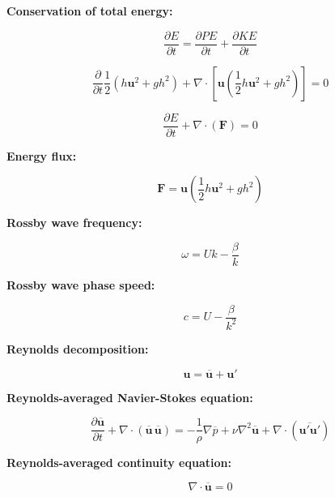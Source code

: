 \documentclass[12pt]{article}
\numberwithin{equation}{section}
\numberwithin{figure}{section}
\numberwithin{table}{section}
\begin{document}
\textbf{Conservation of total energy:}

\begin{equation}
  \frac{\partial E}{\partial t} = \frac{\partial PE}{\partial t} + \frac{\partial KE}{\partial t}
\end{equation}

\begin{equation}
  \frac{\partial}{\partial t} \frac{1}{2} \left(h\mathbf{u}^2 + gh^2\right)
  + \nabla \cdot \left[ \mathbf{u} \left( \frac{1}{2} h\mathbf{u}^2 + gh^2\right) \right] = 0
\end{equation}

\begin{equation}
  \frac{\partial E}{\partial t} + \nabla \cdot \left( \mathbf{F} \right) = 0
\end{equation}

\textbf{Energy flux:}

\begin{equation}
  \mathbf{F} = \mathbf{u} \left( \frac{1}{2} h\mathbf{u}^2 + gh^2\right)
\end{equation}

\textbf{Rossby wave frequency:}

\begin{equation}
  \omega = Uk - \frac{\beta}{k}
\end{equation}

\textbf{Rossby wave phase speed:}

\begin{equation}
  c = U - \frac{\beta}{k^2}
\end{equation}

\textbf{Reynolds decomposition:}

\begin{equation}
  \mathbf{u} = \overline{\mathbf{u}} + \mathbf{u}'
\end{equation}

\textbf{Reynolds-averaged Navier-Stokes equation:}

\begin{equation}
  \frac{\partial \overline{\mathbf{u}}}{\partial t} +
  \nabla \cdot \left( \overline{\mathbf{u}}\, \overline{\mathbf{u}} \right) =
  - \frac{1}{\rho} \nabla \overline{p} +
  \nu \nabla^2 \overline{\mathbf{u}} +
  \nabla \cdot \left( \overline{\mathbf{u}' \mathbf{u}'} \right)
\end{equation}

\textbf{Reynolds-averaged continuity equation:}

\begin{equation}
  \nabla \cdot \overline{\mathbf{u}} = 0
\end{equation}
\end{document}
